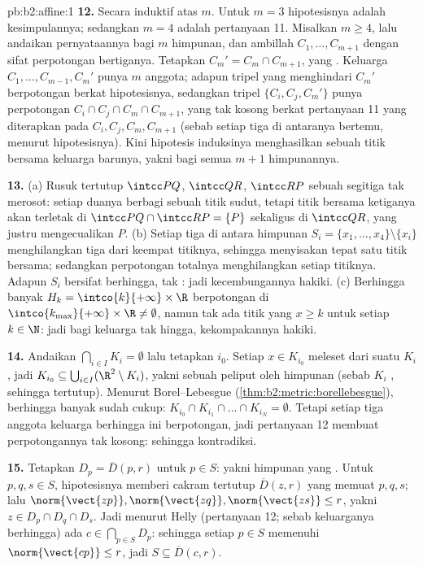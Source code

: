 \begin{solution}{pb:b2:affine:1}
\textbf{12.} Secara induktif atas $m$. Untuk $m = 3$ hipotesisnya adalah
kesimpulannya; sedangkan $m = 4$ adalah pertanyaan 11. Misalkan $m \geq 4$,
lalu andaikan pernyataannya bagi $m$ himpunan, dan ambillah $C_1, \dots,
C_{m+1}$ dengan sifat perpotongan bertiganya. Tetapkan $C_m' =
C_m \cap C_{m+1}$, yang . Keluarga $C_1, \dots, C_{m-1},
C_m'$ punya $m$ anggota; adapun tripel yang menghindari $C_m'$ berpotongan berkat
hipotesisnya, sedangkan tripel $\{C_i, C_j, C_m'\}$ punya
perpotongan $C_i \cap C_j \cap C_m \cap C_{m+1}$, yang tak kosong
berkat pertanyaan 11 yang diterapkan pada $C_i, C_j, C_m, C_{m+1}$ (sebab setiap tiga
di antaranya bertemu, menurut hipotesisnya). Kini hipotesis induksinya
menghasilkan sebuah titik bersama keluarga barunya, yakni bagi semua $m+1$
himpunannya.

\textbf{13.} (a) Rusuk tertutup $\intcc PQ$, $\intcc QR$,
$\intcc RP$ sebuah segitiga tak merosot: setiap duanya berbagi sebuah
titik sudut, tetapi titik bersama ketiganya akan terletak di $\intcc
PQ \cap \intcc RP = \{P\}$ sekaligus di $\intcc QR$, yang justru mengecualikan
$P$. (b) Setiap tiga di antara himpunan $S_i = \{x_1, \dots, x_4\}
\setminus \{x_i\}$ menghilangkan tiga dari keempat titiknya, sehingga menyisakan
tepat satu titik bersama; sedangkan perpotongan totalnya menghilangkan setiap
titiknya. Adapun $S_i$ bersifat berhingga, tak : jadi kecembungannya
hakiki. (c) Berhingga banyak $H_k = \intco{k}{+\infty} \times
\R$ berpotongan di $\intco{k_{\max}}{+\infty} \times \R \neq
\emptyset$, namun tak ada titik yang $x \geq k$ untuk setiap $k \in \N$:
jadi bagi keluarga tak hingga, kekompakannya hakiki.

\textbf{14.} Andaikan $\bigcap_{i \in I}K_i = \emptyset$ lalu
tetapkan $i_0$. Setiap $x \in K_{i_0}$ meleset dari suatu $K_i$, jadi
$K_{i_0} \subseteq \bigcup_{i \in I}(\R^2 \setminus K_i)$, yakni sebuah
peliput oleh himpunan  (sebab $K_i$ , sehingga tertutup). Menurut
Borel--Lebesgue (\cref{thm:b2:metric:borellebesgue}), berhingga
banyak sudah cukup: $K_{i_0} \cap K_{i_1} \cap \dots \cap K_{i_N} =
\emptyset$. Tetapi setiap tiga anggota keluarga berhingga  ini berpotongan, jadi pertanyaan 12 membuat perpotongannya
tak kosong: sehingga kontradiksi.

\textbf{15.} Tetapkan $D_p = \overline D(p, r)$ untuk $p \in S$:
yakni himpunan  yang . Untuk $p, q, s \in S$, hipotesisnya
memberi cakram tertutup $\overline D(z, r)$ yang memuat $p, q, s$;
lalu $\norm{\vect{zp}}, \norm{\vect{zq}}, \norm{\vect{zs}}
\leq r$, yakni $z \in D_p \cap D_q \cap D_s$. Jadi menurut Helly
(pertanyaan 12; sebab keluarganya berhingga) ada $c \in
\bigcap_{p \in S}D_p$: sehingga setiap $p \in S$ memenuhi
$\norm{\vect{cp}} \leq r$, jadi $S \subseteq \overline D(c,
r)$.


\end{solution}
